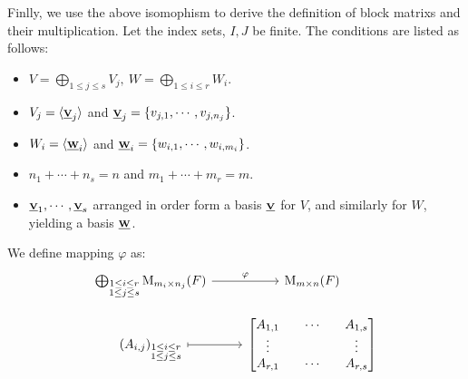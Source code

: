 Finlly, we use the above isomophism to derive the definition of block matrixs and their multiplication. Let the index sets, $I, J$ be finite. The conditions are listed as follows:
\begin{itemize}
    \item $V = \bigoplus_{1 \leq j \leq s} V_j,\ W = \bigoplus_{1 \leq i \leq r} W_i$.
    \item $V_j = \lag \bs{V}{j} \rag$ and $\bs{V}{j} = \{ v_{j,1}, \cdots, v_{j, n_j} \}$.
    \item $W_i = \lag \bs{W}{i} \rag$ and $\bs{W}{i} = \{ w_{i,1}, \cdots, w_{i, m_i} \}$.
    \item $n_1 + \cdots + n_s = n$ and $m_1 + \cdots + m_r = m$.
    \item $\bs{V}{1}, \cdots, \bs{V}{s}$ arranged in order form a basis $\bs{V}{}$ for $V$, and similarly for $W$, yielding a basis $\bs{W}{}$. 
\end{itemize}
We define mapping $\varphi$ as:
\[
    \begin{tikzcd}[row sep=small]
        \bigoplus_{\substack{1 \leq i \leq r \\ 1 \leq j \leq s}}\Mat_{m_i \times n_j}(F) \arrow[r, "\varphi"]
        & \Mat_{m \times n}(F) \\
        (A_{i, j})_{\substack{1 \leq i \leq r \\ 1 \leq j \leq s}} \arrow[mapsto, r]
        & \begin{bmatrix}
            A_{1, 1} & \cdots & A_{1, s} \\
            \vdots & & \vdots \\
            A_{r, 1} & \cdots & A_{r, s}
        \end{bmatrix}
    \end{tikzcd}
\]